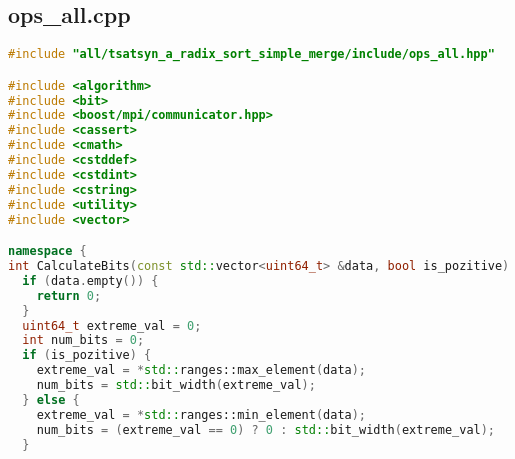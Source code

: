 \documentclass[a4paper,12pt]{article}
\begin{document}
\subsection{ops\_all.cpp}
\begin{lstlisting}[language=C++,
    breaklines=true,       % Автоматический перенос строк
    basicstyle=\small\ttfamily, % Уменьшенный шрифт
    columns=fullflexible ]
#include "all/tsatsyn_a_radix_sort_simple_merge/include/ops_all.hpp"

#include <algorithm>
#include <bit>
#include <boost/mpi/communicator.hpp>
#include <cassert>
#include <cmath>
#include <cstddef>
#include <cstdint>
#include <cstring>
#include <utility>
#include <vector>

namespace {
int CalculateBits(const std::vector<uint64_t> &data, bool is_pozitive) {
  if (data.empty()) {
    return 0;
  }
  uint64_t extreme_val = 0;
  int num_bits = 0;
  if (is_pozitive) {
    extreme_val = *std::ranges::max_element(data);
    num_bits = std::bit_width(extreme_val);
  } else {
    extreme_val = *std::ranges::min_element(data);
    num_bits = (extreme_val == 0) ? 0 : std::bit_width(extreme_val);
  }


\end{lstlisting}
\end{document}
